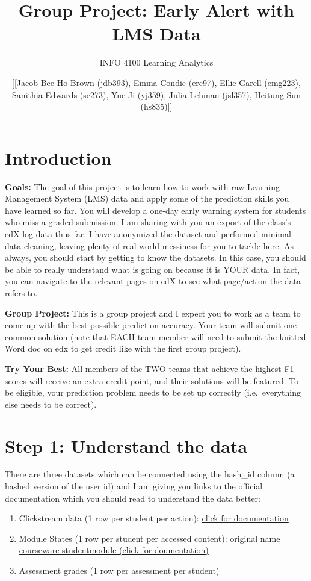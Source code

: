 \documentclass[
]{article}
\title{Group Project: Early Alert with LMS Data}
\subtitle{INFO 4100 Learning Analytics}
\author{{[}{[}Jacob Bee Ho Brown (jdb393), Emma Condie (erc97), Ellie Garell
(emg223), Sanithia Edwards (se273), Yue Ji (yj359), Julia Lehman
(jsl357), Heitung Sun (hs835){]}{]}}
\date{}
\providecommand{\tightlist}{%
  \setlength{\itemsep}{0pt}\setlength{\parskip}{0pt}}
\begin{document}
\maketitle

\hypertarget{introduction}{%
\section{Introduction}\label{introduction}}

\textbf{Goals:} The goal of this project is to learn how to work with
raw Learning Management System (LMS) data and apply some of the
prediction skills you have learned so far. You will develop a one-day
early warning system for students who miss a graded submission. I am
sharing with you an export of the class's edX log data thus far. I have
anonymized the dataset and performed minimal data cleaning, leaving
plenty of real-world messiness for you to tackle here. As always, you
should start by getting to know the datasets. In this case, you should
be able to really understand what is going on because it is YOUR data.
In fact, you can navigate to the relevant pages on edX to see what
page/action the data refers to.

\textbf{Group Project:} This is a group project and I expect you to work
as a team to come up with the best possible prediction accuracy. Your
team will submit one common solution (note that EACH team member will
need to submit the knitted Word doc on edx to get credit like with the
first group project).

\textbf{Try Your Best:} All members of the TWO teams that achieve the
highest F1 scores will receive an extra credit point, and their
solutions will be featured. To be eligible, your prediction problem
needs to be set up correctly (i.e.~everything else needs to be correct).

\hypertarget{step-1-understand-the-data}{%
\section{Step 1: Understand the data}\label{step-1-understand-the-data}}

There are three datasets which can be connected using the hash\_id
column (a hashed version of the user id) and I am giving you links to
the official documentation which you should read to understand the data
better:

\begin{enumerate}
\def\labelenumi{\arabic{enumi}.}
\tightlist
\item
  Clickstream data (1 row per student per action):
  \href{https://edx.readthedocs.io/projects/devdata/en/stable/internal_data_formats/tracking_logs.html\#tracking-logs}{click
  for documentation}
\item
  Module States (1 row per student per accessed content): original name
  \href{https://edx.readthedocs.io/projects/devdata/en/stable/internal_data_formats/sql_schema.html\#courseware-studentmodule}{courseware-studentmodule
  (click for doumentation)}
\item
  Assessment grades (1 row per assessment per student)
\end{enumerate}
\end{document}
